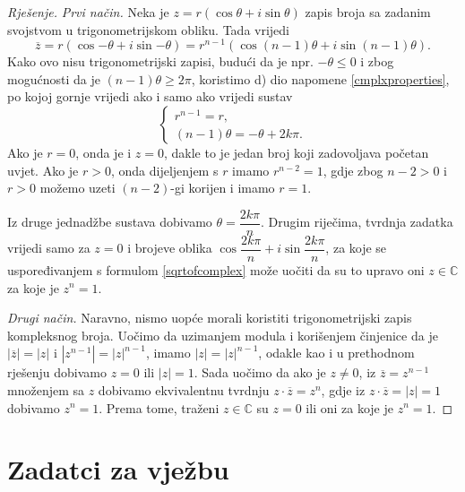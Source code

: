 \begin{proof}[Rješenje]
\textit{Prvi način.} Neka je $z=r(\cos{\theta}+i\sin{\theta})$ zapis broja sa zadanim svojstvom u trigonometrijskom obliku. Tada vrijedi
$$
\overline{z}=r\left(\cos{-\theta}+i\sin{-\theta}\right)=r^{n-1}\left(\cos{(n-1)\theta}+i\sin{(n-1)\theta}\right).
$$
Kako ovo nisu trigonometrijski zapisi, budući da je npr. $-\theta \leq 0$ i zbog mogućnosti da je $(n-1)\theta\geq 2\pi$, koristimo d) dio napomene \ref{cmplxproperties}, po kojoj gornje vrijedi ako i samo ako vrijedi sustav
\[\begin{cases}
r^{n-1}=r,\\
(n-1)\theta=-\theta+2k\pi.
\end{cases}\]
Ako je $r=0$, onda je i $z=0$, dakle to je jedan broj koji zadovoljava početan uvjet. Ako je $r>0$, onda dijeljenjem s $r$ imamo $r^{n-2}=1$, gdje zbog $n-2>0$ i $r>0$ možemo uzeti $(n-2)$-gi korijen i imamo $r=1$.

Iz druge jednadžbe sustava dobivamo $\theta=\dfrac{2k\pi}{n}$. Drugim riječima, tvrdnja zadatka vrijedi samo za $z=0$ i brojeve oblika $\cos{\dfrac{2k\pi}{n}}+i\sin{\dfrac{2k\pi}{n}}$, za koje se uspoređivanjem s formulom \ref{sqrtofcomplex} može uočiti da su to upravo oni $z\in \mathbb{C}$ za koje je $z^n=1$.

\textit{Drugi način.} Naravno, nismo uopće morali koristiti trigonometrijski zapis kompleksnog broja. Uočimo da uzimanjem modula i korišenjem činjenice da je $\left\lvert \overline{z}\right\rvert=\left\lvert z\right\rvert$ i $\left\lvert z^{n-1}\right\rvert=\left\lvert z\right\rvert^{n-1}$, imamo $\left\lvert z\right\rvert=\left\lvert z\right\rvert^{n-1}$, odakle kao i u prethodnom rješenju dobivamo $z=0$ ili $|z|=1$. Sada uočimo da ako je $z\neq 0$, iz $\overline{z}=z^{n-1}$ množenjem sa $z$ dobivamo ekvivalentnu tvrdnju $z\cdot \overline{z}=z^n$, gdje iz $z\cdot \overline{z}=\left\lvert z\right\rvert=1$ dobivamo $z^{n}=1$. Prema tome, traženi $z\in \mathbb{C}$ su $z=0$ ili oni za koje je $z^n=1$.
\end{proof}
\newpage
\section*{Zadatci za vježbu}
